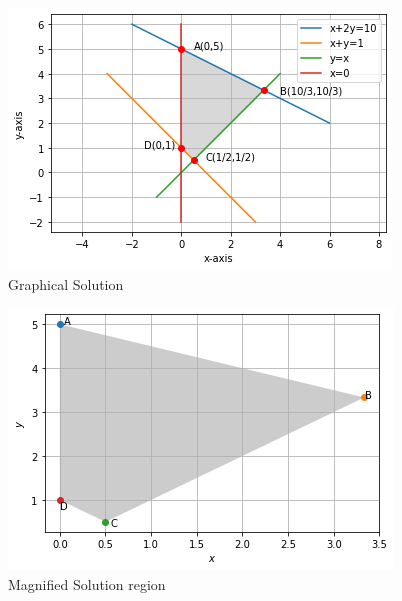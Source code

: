 %
\begin{figure}[!ht]
\centering
\includegraphics[width=\columnwidth]{solutions/su2021/2/58/Figures/Figure_2.58.png}
\caption{Graphical Solution}
\label{ineq/58/fig:fig1}	
\end{figure}

\begin{figure}[!ht]
\centering
\includegraphics[width=\columnwidth]{solutions/su2021/2/58/Figures/2.58(2).png}
\caption{Magnified Solution region}
\label{ineq/58/fig:fig2}	
\end{figure}

